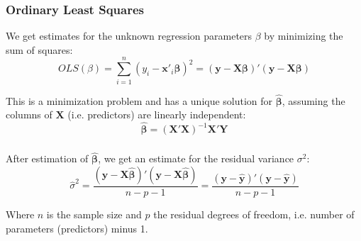 \documentclass{beamer}
\newenvironment{VerbatimIN}
 {\VerbatimEnvironment
  \begin{tcolorbox}[
    breakable,
    colback=lightgray,
    spartan
  ]%
  \begin{Verbatim}}
 {\end{Verbatim}\end{tcolorbox}}
\newenvironment{VerbatimOUT}
 {\VerbatimEnvironment
  \begin{tcolorbox}[
    breakable,
    spartan
  ]%
  \begin{Verbatim}}
 {\end{Verbatim}\end{tcolorbox}}
\begin{document}
\begin{frame}
    \frametitle{Ordinary Least Squares}
    We get estimates for the unknown regression parameters $\beta$ by minimizing the sum of squares:
    \begin{equation*}
        OLS(\beta) = \sum_{i=1}^{n} (y_i - \mathbf{x}'_i \mathbf{\beta})^2 = (\mathbf{y} - \mathbf{X \beta})'(\mathbf{y} - \mathbf{X \beta})
    \end{equation*}
    \vspace{0.5cm}
    
    This is a minimization problem and has a unique solution for $\mathbf{\hat{\beta}}$, assuming the columns of $\mathbf{X}$ (i.e. predictors) are linearly independent:
    \begin{equation*}
        \mathbf{\hat{\beta}} = (\mathbf{X}'\mathbf{X})^{-1} \mathbf{X}'\mathbf{Y}
    \end{equation*}
\end{frame}

\begin{frame}
    \frametitle{}
    After estimation of $\mathbf{\hat{\beta}}$, we get an estimate for the residual variance $\sigma^2$:
    \begin{equation*}
        \hat{\sigma}^2 = \frac{(\mathbf{y} - \mathbf{X} \mathbf{\hat{\beta}})' (\mathbf{y} - \mathbf{X} \mathbf{\hat{\beta}})}{n-p-1} = \frac{(\mathbf{y} - \hat{\mathbf{y}})' (\mathbf{y} - \hat{\mathbf{y}})}{n-p-1}
    \end{equation*}

    
Where $n$ is the sample size and $p$ the residual degrees of freedom, i.e. number of parameters (predictors) minus 1.

\end{frame}


\end{document}
